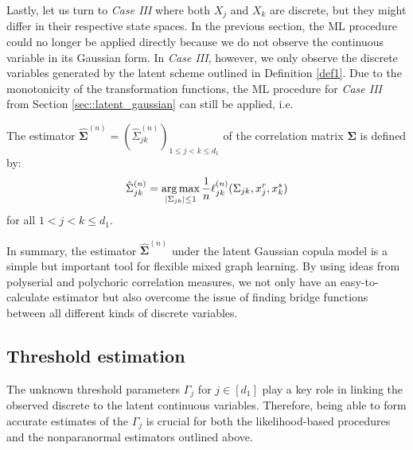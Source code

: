 Lastly, let us turn to \textit{Case III} where both $X_j$ and $X_k$ are discrete, but they might differ in their respective state spaces. In the previous section, the ML procedure could no longer be applied directly because we do not observe the continuous variable in its Gaussian form. In \textit{Case III}, however, we only observe the discrete variables generated by the latent scheme outlined in Definition \ref{def1}. Due to the monotonicity of the transformation functions, the ML procedure for \textit{Case III} from Section \ref{sec::latent_gaussian} can still be applied, i.e.

\begin{definition}
    The estimator $\hat{\mathbf{\Sigma}}^{(n)} = (\hat{\Sigma}_{jk}^{(n)})_{1\leq j < k\leq d_1}$ of the correlation matrix $\mathbf{\Sigma}$ is defined by:
    \begin{equation}
        \hat{\Sigma}_{jk}^{(n)} = \argmax_{\Abs{\Sigma_{jk}} \leq 1} \frac{1}{n} \ell_{jk}^{(n)}(\Sigma_{jk}, x_j^r,x_k^s)
    \end{equation}
    for all $1 < j < k \leq d_1 $.
\end{definition}

In summary, the estimator $\hat{\mathbf{\Sigma}}^{(n)}$ under the latent Gaussian copula model is a simple but important tool for flexible mixed graph learning. By using ideas from polyserial and polychoric correlation measures, we not only have an easy-to-calculate estimator but also overcome the issue of finding bridge functions between all different kinds of discrete variables.

\subsection{Threshold estimation}\label{sec::thresholds}

The unknown threshold parameters $\Gamma_j$ for \(j \in [d_1]\) play a key role in linking the observed discrete to the latent continuous variables. Therefore, being able to form accurate estimates of the $\Gamma_j$ is crucial for both the likelihood-based procedures and the nonparanormal estimators outlined above.

